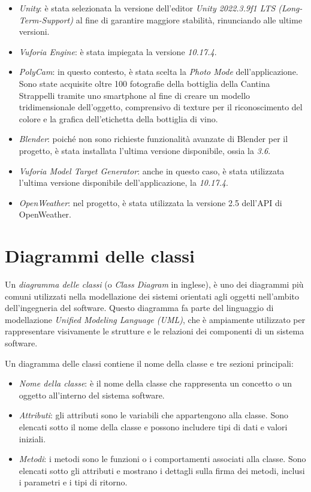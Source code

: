 \begin{itemize}
  \item \textit{Unity}: è stata selezionata la versione dell'editor \textit{Unity 2022.3.9f1 LTS (Long-Term-Support)} al fine di garantire maggiore stabilità, rinunciando alle ultime versioni.
  \item \textit{Vuforia Engine}: è stata impiegata la versione \textit{10.17.4}.
  \item \textit{PolyCam}: in questo contesto, è stata scelta la \textit{Photo Mode} dell'applicazione. Sono state acquisite oltre 100 fotografie della bottiglia della Cantina Strappelli tramite uno smartphone al fine di creare un modello tridimensionale dell'oggetto, comprensivo di texture per il riconoscimento del colore e la grafica dell'etichetta della bottiglia di vino.
  \item \textit{Blender}: poiché non sono richieste funzionalità avanzate di Blender per il progetto, è stata installata l'ultima versione disponibile, ossia la \textit{3.6}.
  \item \textit{Vuforia Model Target Generator}: anche in questo caso, è stata utilizzata l'ultima versione disponibile dell'applicazione, la \textit{10.17.4}.
  \item \textit{OpenWeather}: nel progetto, è stata utilizzata la versione 2.5 dell'API di OpenWeather.
\end{itemize}


\section{Diagrammi delle classi}

Un \textit{diagramma delle classi} (o \textit{Class Diagram} in inglese), è uno dei diagrammi più comuni utilizzati nella modellazione dei sistemi orientati agli oggetti nell'ambito dell'ingegneria del software. Questo diagramma fa parte del linguaggio di modellazione \textit{Unified Modeling Language (UML)}, che è ampiamente utilizzato per rappresentare visivamente le strutture e le relazioni dei componenti di un sistema software.

Un diagramma delle classi contiene il nome della classe e tre sezioni principali:

\begin{itemize}
    \item \textit{Nome della classe}: è il nome della classe che rappresenta un concetto o un oggetto all'interno del sistema software.
    \item \textit{Attributi}: gli attributi sono le variabili che appartengono alla classe. Sono elencati sotto il nome della classe e possono includere tipi di dati e valori iniziali.
    \item \textit{Metodi}: i metodi sono le funzioni o i comportamenti associati alla classe. Sono elencati sotto gli attributi e mostrano i dettagli sulla firma dei metodi, inclusi i parametri e i tipi di ritorno.
\end{itemize}


